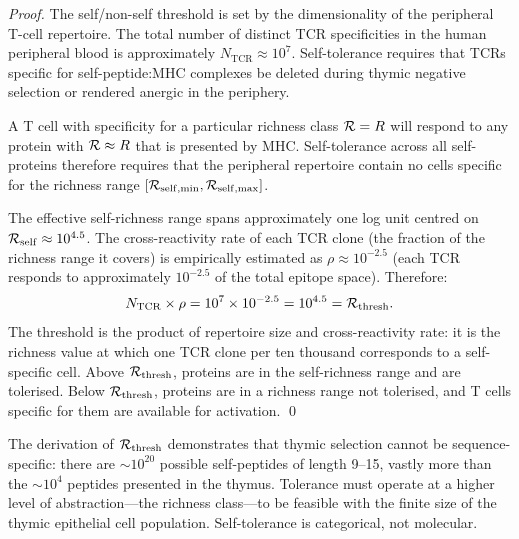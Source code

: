 \begin{proof}
The self/non-self threshold is set by the dimensionality of the peripheral
T-cell repertoire. The total number of distinct TCR specificities in the
human peripheral blood is approximately $N_{\mathrm{TCR}} \approx 10^7$.
Self-tolerance requires that TCRs specific for self-peptide:MHC complexes be
deleted during thymic negative selection or rendered anergic in the periphery.

A T cell with specificity for a particular richness class $\mathcal{R} = R$ will
respond to any protein with $\mathcal{R} \approx R$ that is presented by MHC.
Self-tolerance across all self-proteins therefore requires that the
peripheral repertoire contain no cells specific for the richness range
$[\mathcal{R}_{\mathrm{self,min}}, \mathcal{R}_{\mathrm{self,max}}]$.

The effective self-richness range spans approximately one log unit centred
on $\mathcal{R}_{\mathrm{self}} \approx 10^{4.5}$. The cross-reactivity rate of
each TCR clone (the fraction of the richness range it covers) is empirically
estimated as $\rho \approx 10^{-2.5}$ (each TCR responds to approximately
$10^{-2.5}$ of the total epitope space). Therefore:
\begin{equation}
  N_{\mathrm{TCR}} \times \rho = 10^7 \times 10^{-2.5} = 10^{4.5} = \mathcal{R}_{\mathrm{thresh}}.
\end{equation}
The threshold is the product of repertoire size and cross-reactivity rate:
it is the richness value at which one TCR clone per ten thousand corresponds
to a self-specific cell. Above $\mathcal{R}_{\mathrm{thresh}}$, proteins are in the
self-richness range and are tolerised. Below $\mathcal{R}_{\mathrm{thresh}}$, proteins
are in a richness range not tolerised, and T cells specific for them are available
for activation. \qed
\end{proof}

\begin{remark}
The derivation of $\mathcal{R}_{\mathrm{thresh}}$ demonstrates that thymic selection
cannot be sequence-specific: there are $\sim 10^{20}$ possible self-peptides
of length 9--15, vastly more than the $\sim 10^4$ peptides presented in the
thymus. Tolerance must operate at a higher level of abstraction---the richness
class---to be feasible with the finite size of the thymic epithelial cell
population. Self-tolerance is categorical, not molecular.
\end{remark}

